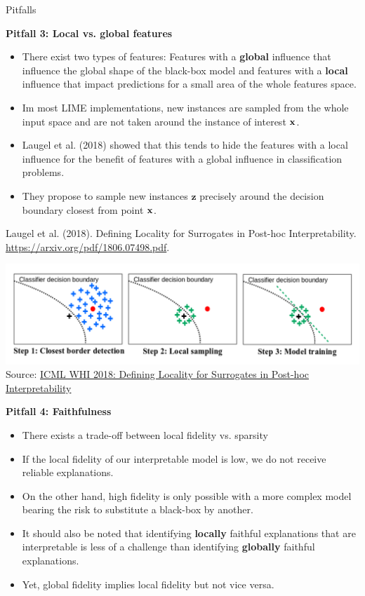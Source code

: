 \documentclass[11pt,compress,t,notes=noshow, xcolor=table]{beamer}
\newcommand{\zv}{\mathbf{z}}
\begin{document}
\begin{vbframe}{Pitfalls}

\textbf{Pitfall 3: Local vs. global features}
\begin{itemize}
	\item There exist two types of features: Features with a \textbf{global} influence that influence the global shape of the black-box model and features with a \textbf{local} influence that impact predictions for a small area of the whole features space. 
	\item Im most LIME implementations, new instances are sampled from the whole input space and are not taken around the instance of interest $\xv$.
	\item Laugel et al. (2018) showed that this tends to hide the features with a local influence for the benefit of features with a global influence in classification problems. 
	\item They propose to sample new instances $\zv$ precisely around the decision boundary closest from point $\xv$.
\end{itemize}
{\tiny Laugel et al. (2018). Defining Locality for Surrogates in Post-hoc Interpretability. \url{https://arxiv.org/pdf/1806.07498.pdf}.}
 \begin{center}
	\includegraphics[width=1\textwidth]{figure/lime_bordersample}
	{\tiny Source: \href{http://webia.lip6.fr/~laugel/files/WHI_ICML_slides.pdf}{ICML WHI 2018: Defining Locality for Surrogates in Post-hoc Interpretability}}
\end{center}
\framebreak

\textbf{Pitfall 4: Faithfulness}
\begin{itemize}
	\item There exists a trade-off between local fidelity vs. sparsity 
	\item If the local fidelity of our interpretable model is low, we do not receive reliable explanations.
	\item On the other hand, high fidelity is only possible with a more complex model bearing the risk to substitute a black-box by another.
	\item It should also be noted that identifying \textbf{locally} faithful explanations that are interpretable is less of a challenge than identifying \textbf{globally} faithful explanations. 
	\item Yet, global fidelity implies local fidelity but not vice versa. 
\end{itemize}


\end{vbframe}
\end{document}

